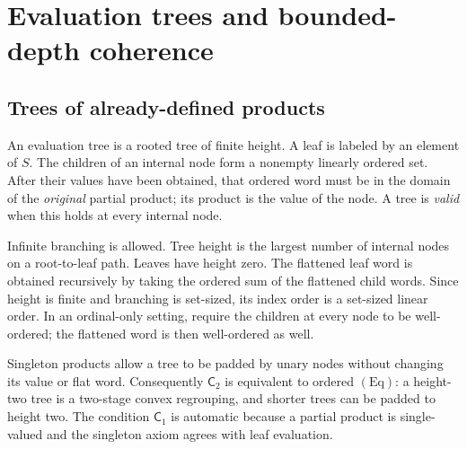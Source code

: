 \documentclass[11pt,letterpaper]{article}
\numberwithin{equation}{section}
\theoremstyle{definition}
\newtheorem{definition}[theorem]{Definition}
\theoremstyle{remark}
\newcommand{\Eq}{\mathrm{Eq}}
\newcommand{\Coh}[1]{\mathsf C_{#1}}
\begin{document}
\section{Evaluation trees and bounded-depth coherence}
\label{sec:trees}
\subsection{Trees of already-defined products}
An evaluation tree is a rooted tree of finite height. A leaf is labeled by an element of $S$. The children of an internal node form a nonempty linearly ordered set. After their values have been obtained, that ordered word must be in the domain of the \emph{original} partial product; its product is the value of the node. A tree is \emph{valid} when this holds at every internal node.

Infinite branching is allowed. Tree height is the largest number of internal nodes on a root-to-leaf path. Leaves have height zero. The flattened leaf word is obtained recursively by taking the ordered sum of the flattened child words. Since height is finite and branching is set-sized, its index order is a set-sized linear order. In an ordinal-only setting, require the children at every node to be well-ordered; the flattened word is then well-ordered as well.


Singleton products allow a tree to be padded by unary nodes without changing its value or flat word. Consequently $\Coh2$ is equivalent to ordered $(\Eq)$: a height-two tree is a two-stage convex regrouping, and shorter trees can be padded to height two. The condition $\Coh1$ is automatic because a partial product is single-valued and the singleton axiom agrees with leaf evaluation.
\end{document}
